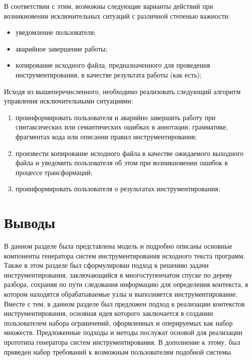 В соответствии с этим, возможны следующие варианты действий при возникновении исключительных ситуаций с различной степенью важности:

\begin{itemize}[noitemsep]
  \item уведомление пользователя;
  \item аварийное завершение работы;
  \item копирование исходного файла, предназначенного для проведения инструментирования, в качестве результата работы (как есть);
\end{itemize}

Исходя из вышеперечисленного, необходимо реализовать следующий алгоритм управления исключительными ситуациями:
\begin{enumerate}[noitemsep]
  \item проинформировать пользователя и аварийно завершить работу при синтаксических или семантических ошибках в аннотации, грамматике, фрагментах кода или описании правил инструментирования;
  \item произвести копирование исходного файла в качестве ожидаемого выходного файла и уведомить пользователя об этом при возникновении ошибок в процессе трансформаций;
  \item проинформировать пользователя о результатах инструментирования;
\end{enumerate}

\section{Выводы}

В данном разделе была представлена модель и подробно описаны основные компоненты генератора систем инструментирования исходного текста программ.
Также в этом разделе был сформулирован подход к решению задачи инструментирования, заключающийся в многоступенчатом спуске по дереву разбора, сохраняя по пути следования информацию для определения контекста, в котором находятся обрабатываемые узлы и выполняется инструментирование.
Вместе с тем, в данном разделе был предложен подход к реализации контекстов инструментирования, основная идея которого заключается в создании пользователем набора ограничений, оформленных и оперируемых как набор множеств.
Предложенные подходы и методы послужат основой для реализации прототипа генератора систем инструментирования.
В дополнение к этому, был приведен набор требований к возможным пользователям подобной системы.
